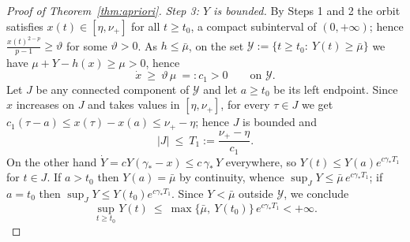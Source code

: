 \documentclass[10pt,a4paper]{amsart}
\newcommand{\gs}{\gamma_{*}}
\newcommand{\mub}{\bar\mu}
\begin{document}
\begin{proof}[Proof of Theorem~\ref{thm:apriori}]
\smallskip
\noindent\emph{Step 3: $Y$ is bounded.} By Steps 1 and 2 the orbit satisfies
$x(t)\in[\eta,\nu_{+}]$ for all $t\ge t_{0}$, a compact subinterval of
$(0,+\infty)$; hence $\frac{x(t)^{2-p}}{p-1}\ge\vartheta$ for some
$\vartheta>0$. As $h\le\mub$,
on the set $\mathcal Y:=\{t\ge t_{0}:\ Y(t)\ge\mub\}$ we have
$\mu+Y-h(x)\ge\mu>0$, hence
\[
\dot x\ \ge\ \vartheta\,\mu\ =:c_{1}>0\qquad\text{on }\mathcal Y .
\]
Let $J$ be any connected component of $\mathcal Y$ and let $a\ge t_{0}$ be its
left endpoint. Since $x$ increases on $J$ and takes values in
$[\eta,\nu_{+}]$, for every $\tau\in J$ we get
$c_{1}(\tau-a)\le x(\tau)-x(a)\le\nu_{+}-\eta$; hence $J$ is bounded and
\[
|J|\ \le\ T_{1}:=\frac{\nu_{+}-\eta}{c_{1}} .
\]
On the other hand $\dot Y=cY(\gs-x)\le c\,\gs\,Y$ everywhere, so
$Y(t)\le Y(a)e^{c\gs T_{1}}$ for $t\in J$. If $a>t_{0}$ then $Y(a)=\mub$ by
continuity, whence $\sup_{J}Y\le\mub\,e^{c\gs T_{1}}$; if $a=t_{0}$ then
$\sup_{J}Y\le Y(t_{0})e^{c\gs T_{1}}$. Since
$Y<\mub$ outside $\mathcal Y$, we conclude
\[
\sup_{t\ge t_{0}}Y(t)\ \le\
\max\big\{\mub,\ Y(t_{0})\big\}\,e^{c\gs T_{1}}<+\infty .
\]

\end{proof}
\end{document}
